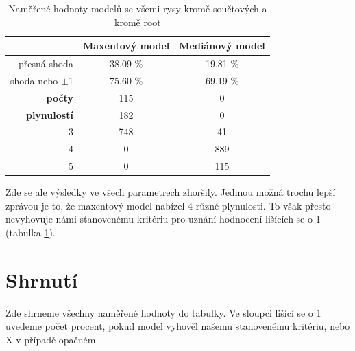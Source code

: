 \documentclass[12pt,a4paper]{report}
\begin{document}
\begin{table}[!htbp]
\begin{center}
\begin{tabular}{|r|c|c|}
\hline
 & \textbf{Maxentový model} & \textbf{Mediánový model} \\
 \hline
přesná shoda & 38.09 \%  & 19.81 \%  \\
\hline
shoda nebo $\pm$1 & 75.60 \% & 69.19 \%  \\
\hline
     \textbf{počty} \quad 1 & 115   & \color{red} 0   \\
\textbf{plynulostí} \quad 2 & 182 & \color{red}0   \\
                          3 & 748 & 41 \\
                          4 & \color{red}0   & 889 \\
                          5 & \color{red}0   & 115  \\
\hline
\end{tabular}
\caption{Naměřené hodnoty modelů se všemi rysy kromě součtových a kromě root}\label{tb:woutsumsroot}
\end{center}
\end{table}

Zde se ale výsledky ve všech parametrech zhoršily. Jedinou možná trochu lepší zprávou je to, že maxentový model nabízel 4 různé plynulosti. To však přesto nevyhovuje námi stanovenému kritériu pro uznání hodnocení lišících se o 1 (tabulka \ref{tb:woutsumsroot}).

\pagebreak

\section{Shrnutí}
Zde shrneme všechny naměřené hodnoty do tabulky. Ve sloupci lišící se o 1 uvedeme počet procent, pokud model vyhověl našemu stanovenému kritériu, nebo X v případě opačném.
\end{document}
